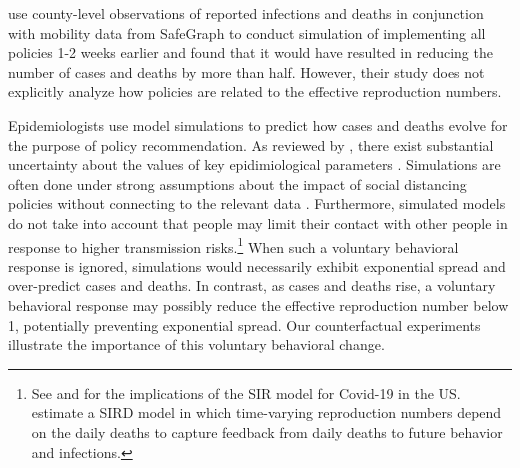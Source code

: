 \documentclass[11pt,reqno,letter]{amsart}
\theoremstyle{definition}
\begin{document}
 \cite{pei2020} use county-level observations of reported infections and deaths in conjunction with mobility  data from SafeGraph to conduct simulation of implementing all policies 1-2 weeks earlier and found that it would have resulted in reducing the number of cases and deaths by more than half. However, their study does not  explicitly analyze how policies are related to the effective reproduction numbers. %

Epidemiologists use model simulations to predict how cases and deaths evolve for the purpose of policy recommendation. As reviewed by \cite{avery2020}, there exist substantial uncertainty about the values of key epidimiological parameters \citep[see also][]{atkeson2020b,stock2020}. Simulations are often done under strong assumptions about the impact of social distancing policies without connecting to the relevant data  \citep[e.g.,][]{ferguson2020}. Furthermore, simulated models do not take into account that people may limit their contact with other people in response to higher transmission risks.\footnote{See \cite{atkeson2020a} and \cite{stock2020} for the implications of the SIR model for Covid-19 in the US. \cite{NBERw27128} estimate a SIRD model in which time-varying reproduction numbers depend on the daily deaths to capture feedback from daily deaths to future behavior and infections.}  When such a voluntary behavioral response is ignored, simulations would necessarily exhibit exponential spread and over-predict  cases and deaths. In contrast, as cases and deaths rise, a voluntary behavioral response may possibly reduce the effective reproduction number  below 1,  potentially preventing exponential spread. Our counterfactual experiments  illustrate the importance of this voluntary behavioral change.
\end{document}
